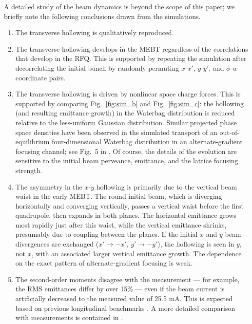 \documentclass[%
 reprint,
nofootinbib,
 amsmath,amssymb,
 aps,
prstab,
]{revtex4-2}
\begin{document}
A detailed study of the beam dynamics is beyond the scope of this paper; we briefly note the following conclusions drawn from the simulations.
%
\begin{enumerate}
    
    \item The transverse hollowing is qualitatively reproduced.
    
    \item The transverse hollowing develops in the MEBT regardless of the correlations that develop in the RFQ. This is supported by repeating the simulation after decorrelating the initial bunch by randomly permuting $x$-$x'$, $y$-$y'$, and $\phi$-$w$ coordinate pairs.
    
    \item The transverse hollowing is driven by nonlinear space charge forces. This is supported by comparing Fig.~\ref{fig:sim_b} and Fig.~\ref{fig:sim_c}: the hollowing (and resulting emittance growth) in the Waterbag distribution is reduced relative to the less-uniform Gaussian distribution. Similar projected phase space densities have been observed in the simulated transport of an out-of-equilibrium four-dimensional Waterbag distribution in an alternate-gradient focusing channel; see Fig.~5 in \cite{Lund2009}. Of course, the details of the evolution are sensitive to the initial beam perveance, emittance, and the lattice focusing strength.
    
    \item The asymmetry in the $x$-$y$ hollowing is primarily due to the vertical beam waist in the early MEBT. The round initial beam, which is diverging horizontally and converging vertically, passes a vertical waist before the first quadrupole, then expands in both planes. The horizontal emittance grows most rapidly just after this waist, while the vertical emittance shrinks, presumably due to coupling between the planes. If the initial $x$ and $y$ beam divergences are exchanged ($x' \rightarrow -x'$, $y' \rightarrow -y'$), the hollowing is seen in $y$, not $x$, with an associated larger vertical emittance growth. The dependence on the exact pattern of alternate-gradient focusing is weak.
    
    \item The second-order moments disagree with the measurement --- for example, the RMS emittances differ by over 15\% --- even if the beam current is artificially decreased to the measured value of 25.5 mA. This is expected based on previous longitudinal benchmarks \cite{Ruisard2020}. A more detailed comparison with measurements is contained in \cite{Ruisard2022-NAPAC}.

\end{enumerate}
\end{document}
